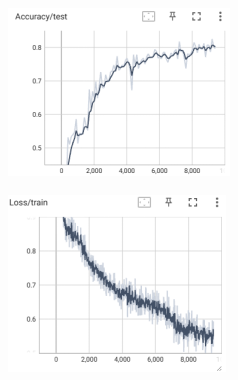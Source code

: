 \documentclass[12pt]{article}
\begin{document}
\begin{figure}[htbp]
	\centering
	\begin{minipage}{0.4\linewidth}
		\centering
		\includegraphics[width=0.9\linewidth]{./figures/3w1s_acc.png}
		\label{pic one}%
	\end{minipage}
	\begin{minipage}{0.4\linewidth}
		\centering
		\includegraphics[width=0.9\linewidth]{./figures/3w1s_train_loss.png}
		\label{pic two}%
	\end{minipage}
	\begin{minipage}{0.4\linewidth}
		\centering

\end{minipage}
\end{figure}
\end{document}
